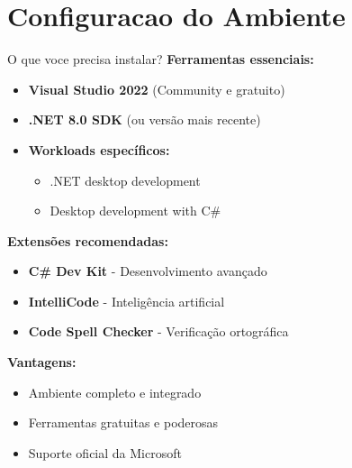 \documentclass[aspectratio=169]{beamer}
\begin{document}
\section{Configuracao do Ambiente}

\begin{frame}{O que voce precisa instalar?}
\textbf{Ferramentas essenciais:}
\begin{itemize}
    \item \textbf{Visual Studio 2022} (Community e gratuito)
    \item \textbf{.NET 8.0 SDK} (ou versão mais recente)
    \item \textbf{Workloads específicos:}
    \begin{itemize}
        \item .NET desktop development
        \item Desktop development with C\#
    \end{itemize}
\end{itemize}

\textbf{Extensões recomendadas:}
\begin{itemize}
    \item \textbf{C\# Dev Kit} - Desenvolvimento avançado
    \item \textbf{IntelliCode} - Inteligência artificial
    \item \textbf{Code Spell Checker} - Verificação ortográfica
\end{itemize}

\textbf{Vantagens:}
\begin{itemize}
    \item Ambiente completo e integrado
    \item Ferramentas gratuitas e poderosas
    \item Suporte oficial da Microsoft
\end{itemize}
\end{frame}
\end{document}
